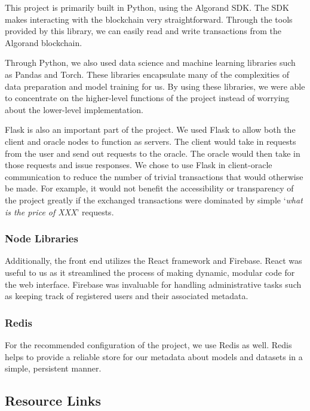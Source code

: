 \documentclass{ledger}
\begin{document}
This project is primarily built in Python, using the Algorand SDK.  The SDK makes interacting with the blockchain very
straightforward.  Through the tools provided by this library, we can easily read and write transactions from the Algorand
blockchain.

Through Python, we also used data science and machine learning libraries such as Pandas and Torch.  These libraries
encapsulate many of the complexities of data preparation and model training for us. By using these libraries, we were
able to concentrate on the higher-level functions of the project instead of worrying about the lower-level implementation.

Flask is also an important part of the project.  We used Flask to allow both the client and oracle nodes to function as
servers.  The client would take in requests from the user and send out requests to the oracle.  The oracle would then
take in those requests and issue responses.  We chose to use Flask in client-oracle communication to reduce the number
of trivial transactions that would otherwise be made.  For example, it would not benefit the accessibility or transparency
of the project greatly if the exchanged transactions were dominated by simple `\textit{what is the price of XXX}' requests.

\subsubsection{Node Libraries}

Additionally, the front end utilizes the React framework and Firebase.  React was useful to us as it streamlined the
process of making dynamic, modular code for the web interface.  Firebase was invaluable for handling administrative tasks
such as keeping track of registered users and their associated metadata.

\subsubsection{Redis}

For the recommended configuration of the project, we use Redis as well.  Redis helps to provide a reliable store for our
metadata about models and datasets in a simple, persistent manner.

\subsection{Resource Links}
\end{document}
